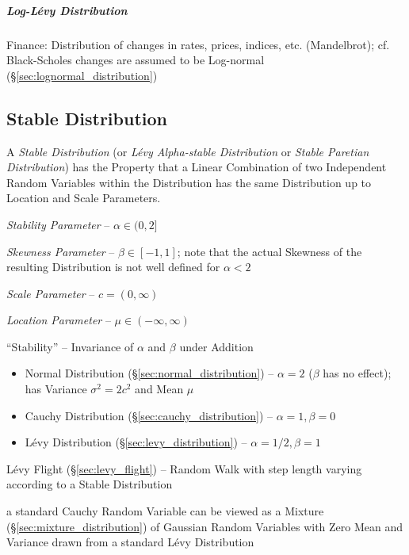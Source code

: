 \subparagraph{Log-L\'evy Distribution}\label{sec:log_levy}\hfill

Finance: Distribution of changes in rates, prices, indices, etc. (Mandelbrot);
cf. Black-Scholes changes are assumed to be Log-normal
(\S\ref{sec:lognormal_distribution})



\subsection{Stable Distribution}\label{sec:stable_distribution}

A \emph{Stable Distribution} (or \emph{L\'evy Alpha-stable Distribution} or
\emph{Stable Paretian Distribution}) has the Property that a Linear Combination
of two Independent Random Variables within the Distribution has the same
Distribution up to Location and Scale Parameters.

\emph{Stability Parameter} -- $\alpha \in (0, 2]$

\emph{Skewness Parameter} -- $\beta \in [-1, 1]$; note that the actual Skewness
of the resulting Distribution is not well defined for $\alpha < 2$

\emph{Scale Parameter} -- $c = (0, \infty)$

\emph{Location Parameter} -- $\mu \in (-\infty, \infty)$

``Stability'' -- Invariance of $\alpha$ and $\beta$ under Addition

\begin{itemize}
  \item Normal Distribution (\S\ref{sec:normal_distribution}) -- $\alpha = 2$
    ($\beta$ has no effect); has Variance $\sigma^2 = 2c^2$ and Mean $\mu$
  \item Cauchy Distribution (\S\ref{sec:cauchy_distribution}) --
    $\alpha = 1, \beta = 0$
  \item L\'evy Distribution (\S\ref{sec:levy_distribution}) --
    $\alpha = 1/2, \beta = 1$
\end{itemize}

\fist L\'evy Flight (\S\ref{sec:levy_flight}) -- Random Walk with step length
varying according to a Stable Distribution

a standard Cauchy Random Variable can be viewed as a Mixture
(\S\ref{sec:mixture_distribution}) of Gaussian Random Variables with Zero Mean
and Variance drawn from a standard L\'evy Distribution

